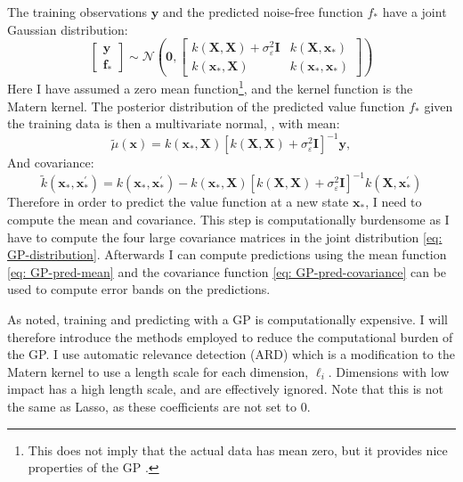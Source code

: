 \documentclass[11pt]{article}
\begin{document}
The training observations \( \mathbf{y} \) and the predicted noise-free function \( f_{*} \) 
have a joint Gaussian distribution:
\begin{equation}\label{eq: GP-distribution}
  \begin{bmatrix}
    \mathbf{y} \\
    \mathbf{f}_{*}
  \end{bmatrix}
  \sim 
  \mathcal{N} \left( \mathbf{0},
                \begin{bmatrix}
                  k(\mathbf{X}, \mathbf{X}) + \sigma^{2}_{\varepsilon} \mathbf{I} & k(\mathbf{X}, \mathbf{x}_{*}) \\
                  k(\mathbf{x}_{*}, \mathbf{X}) & k(\mathbf{x}_{*}, \mathbf{x}_{*})
                \end{bmatrix}
              \right)
\end{equation}
Here I have assumed a zero mean function\footnote{This does not imply that the actual data has mean zero, but it provides nice properties of the \ac{GP} \autocite{MurphyBook2023}.}, and the kernel function is the Matern kernel.
The posterior distribution of the predicted value function \( f_{*} \) given the training data is then a multivariate normal, \autocite{MurphyBook2023},
with mean:
\begin{equation} \label{eq: GP-pred-mean}
  \tilde{\mu}(\mathbf{x}) = k(\mathbf{x}_{*}, \mathbf{X}) [k(\mathbf{X}, \mathbf{X}) + \sigma^{2}_{\varepsilon} \mathbf{I}]^{-1} \mathbf{y},
\end{equation}
And covariance:
\begin{equation} \label{eq: GP-pred-covariance}
 \tilde{k} (\mathbf{x}_* , \mathbf{x}_{*}^{'}) = 
 k (\mathbf{x}_* , \mathbf{x}_{*}^{'}) - 
 k (\mathbf{x}_* , \mathbf{X}) 
  [k (\mathbf{X} , \mathbf{X}) + \sigma^{2}_{\varepsilon} \mathbf{I}]^{-1}
  k (\mathbf{X} , \mathbf{x}_{*}^{'})
\end{equation}
Therefore in order to predict the value function at a new state $\mathbf{x}_{*}$, I need to compute the mean and covariance.
This step is computationally burdensome as I have to compute the four large covariance matrices in the joint distribution \eqref{eq: GP-distribution}.
Afterwards I can compute predictions using the mean function \eqref{eq: GP-pred-mean} and the covariance function \eqref{eq: GP-pred-covariance}
can be used to compute error bands on the predictions. 

As noted, training and predicting with a \ac{GP} is computationally expensive. I will therefore introduce
the methods employed to reduce the computational burden of the \ac{GP}.
I use automatic relevance detection (ARD) which is a modification to the Matern kernel to use
a length scale for each dimension, $\ell_{i}$. Dimensions with low impact has a high length scale, and are effectively ignored.
Note that this is not the same as Lasso, as these coefficients are not set to $0$.
\end{document}
